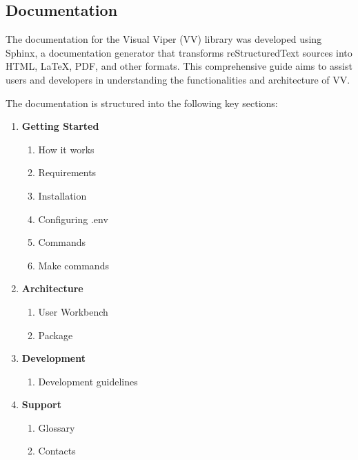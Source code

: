 \subsection{Documentation}\label{documentation}

The documentation for the Visual Viper (VV) library was developed using
Sphinx, a documentation generator that transforms reStructuredText
sources into HTML, LaTeX, PDF, and other formats. This comprehensive
guide aims to assist users and developers in understanding the
functionalities and architecture of VV.

The documentation is structured into the following key sections:

\begin{enumerate}
\def\labelenumi{\arabic{enumi}.}
\item
  \textbf{Getting Started}

  \begin{enumerate}
  \def\labelenumii{\alph{enumii}.}
  \item
    How it works
  \item
    Requirements
  \item
    Installation
  \item
    Configuring .env
  \item
    Commands
  \item
    Make commands
  \end{enumerate}
\item
  \textbf{Architecture}

  \begin{enumerate}
  \def\labelenumii{\alph{enumii}.}
  \item
    User Workbench
  \item
    Package
  \end{enumerate}
\item
  \textbf{Development}

  \begin{enumerate}
  \def\labelenumii{\alph{enumii}.}
  \item
    Development guidelines
  \end{enumerate}
\item
  \textbf{Support}

  \begin{enumerate}
  \def\labelenumii{\alph{enumii}.}
  \item
    Glossary
  \item
    Contacts
  \end{enumerate}
\end{enumerate}

